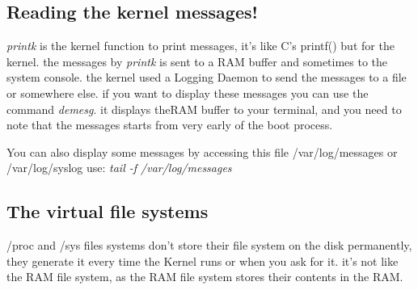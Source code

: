 \documentclass{article}
\begin{document}
\subsection{Reading the kernel messages!}
\textit{printk} is the kernel function to print messages, it's like C's printf() but for the kernel. the messages by \textit{printk} is sent to a RAM buffer and sometimes to the system console.
the kernel used a Logging Daemon to send the messages to a file or somewhere else. if you want to display these messages you can use the command \textit{demesg}. it displays theRAM buffer to your terminal, and you need to note that the messages starts from very early of the boot process.


You can also display some messages by accessing this file /var/log/messages or /var/log/syslog
use: \textit{tail -f /var/log/messages}

\subsection{The virtual file systems}
/proc and /sys files systems don't store their file system on the disk permanently, they generate it every time the Kernel runs or when you ask for it.
it's not like the RAM file system, as the RAM file system stores their contents in the RAM.
\end{document}
